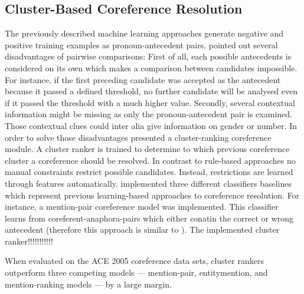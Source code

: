 \subsection{Cluster-Based Coreference Resolution}
The previously described machine learning approaches generate negative and positive training examples as pronoun-antecedent pairs. \cite{rahman2009supervised} pointed out several disadvantages of pairwise comparisons: First of all, each possible antecedents is considered on its own which makes a comparison between candidates impossible. For instance, if the first preceding candidate was accepted as the antecedent because it passed a defined threshold, no further candidate will be analysed even if it passed the threshold with a much higher value. Secondly, several contextual information might be missing as only the pronoun-antecedent pair is examined. Those contextual clues could inter alia give information on gender or number. 
In order to solve those disadvantages \cite{rahman2009supervised} presented a cluster-ranking coreference module. A cluster ranker is trained to determine to which previous coreference cluster a coreference should be resolved. In contrast to rule-based approaches \citep{mitkov1998robust} no manual constraints restrict possible candidates. Instead, restrictions are learned through features automatically. \cite{rahman2009supervised} implemented three different classifiers baselines which represent previous learning-based approaches to coreference resolution. For instance, a mention-pair coreference model was implemented. This classifier learns from coreferent-anaphora-pairs which either conatin the correct or wrong antecedent (therefore this approach is similar to \cite{soon2001machine}). 
The implemented cluster ranker!!!!!!!!!!!

When evaluated on the ACE 2005
coreference data sets, cluster rankers outperform
three competing models — mention-pair, entitymention,
and mention-ranking models — by a
large margin.

